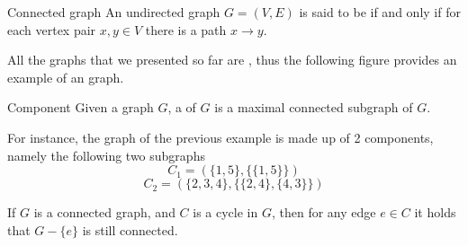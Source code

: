 \documentclass[a4paper, 12pt]{report}
\begin{document}
    \begin{frameddefn}{Connected graph}
        An undirected graph $G = (V, E)$ is said to be  if and only if for each vertex pair $x, y \in V$ there is a path $x \to y$.
    \end{frameddefn}

    All the graphs that we presented so far are , thus the following figure provides an example of an  graph.

    \begin{figure}[H]
        \centering
    \end{figure}

    \begin{frameddefn}{Component}
        Given a graph $G$, a  of $G$ is a maximal connected subgraph of $G$.
    \end{frameddefn}

    For instance, the graph of the previous example is made up of 2 components, namely the following two subgraphs $$C_1 = (\{1, 5\}, \{\{1, 5\}\})$$ $$C_2 = (\{2, 3, 4\}, \{\{2, 4\}, \{4, 3\}\})$$

    \begin{framedprop}[label={avoid cycle}]{}
        If $G$ is a connected graph, and $C$ is a cycle in $G$, then for any edge $e \in C$ it holds that $G - \{e\}$ is still connected.
    \end{framedprop}
\end{document}
